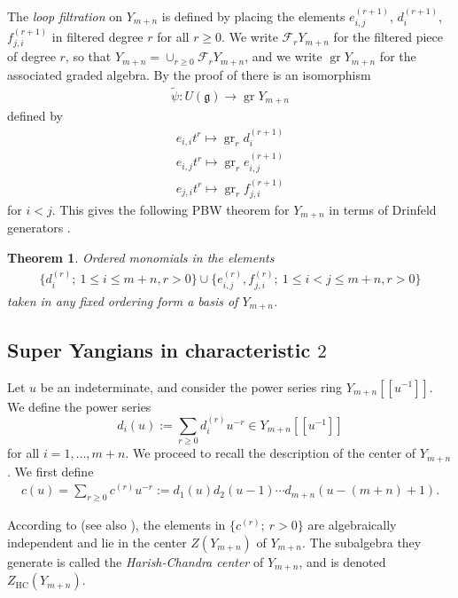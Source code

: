 \documentclass[12pt,reqno]{amsart}
\newcommand{\cF}{\mathcal{F}}
\newcommand{\fg}{\mathfrak{g}}
\DeclareMathOperator{\gr}{gr}
\DeclareMathOperator{\HC}{HC}
\numberwithin{equation}{section}
\newtheorem{Theorem}{Theorem}[section]
\theoremstyle{Theorem}
\theoremstyle{remark}
\numberwithin{equation}{section}
\begin{document}
The {\it loop filtration} on $Y_{m+n}$ is defined by placing the elements $e_{i,j}^{(r+1)}$,
$d_{i}^{(r+1)}$, $f_{j,i}^{(r+1)}$ in filtered degree $r$ for all $r\geq 0$. 
We write $\cF_r Y_{m+n}$ for the filtered piece of degree $r$,
so that $Y_{m+n}=\cup_{r\geq 0}\cF_r Y_{m+n}$,
and we write $\gr Y_{m+n}$ for the associated graded algebra.
By the proof of \cite[Theorem 4.3]{BT18} there is an isomorphism
\begin{align}\label{ug iso grymn}
\tilde{\psi}: U(\fg)\rightarrow \gr Y_{m+n}
\end{align}
defined by
\begin{equation}
\begin{aligned}\label{gr def}
e_{i,i}t^r\mapsto \gr_r d_i^{(r+1)}\\
e_{i,j}t^r\mapsto \gr_r e_{i,j}^{(r+1)}\\
e_{j,i}t^r\mapsto \gr_r f_{j,i}^{(r+1)}
\end{aligned}
\end{equation}
for $i<j$.
This gives the following PBW theorem for $Y_{m+n}$ in terms of Drinfeld generators \cite[Theorem 4.5]{BT18}.
\begin{Theorem}\label{thm:PBW ymn Drinfeld}
Ordered monomials in the elements
\begin{align}\label{Drinfeld generators}
 \{d_i^{(r)};~1\leq i\leq m+n, r>0\}\cup\{e_{i,j}^{(r)},f_{j,i}^{(r)};~1\leq i<j\leq m+n, r>0\}   
\end{align}
taken in any fixed ordering form a basis of $Y_{m+n}$.
\end{Theorem}
\subsection{Super Yangians in characteristic $2$}
Let $u$ be an indeterminate,
and consider the power series ring $Y_{m+n}[[u^{-1}]]$.
We define the power series
\[
d_i(u):=\sum\limits_{r\geq 0}d_i^{(r)}u^{-r}\in Y_{m+n}[[u^{-1}]]
\]
for all $i=1,\dots,m+n$.
We proceed to recall the description of the center of $Y_{m+n}$.
We first define
\begin{align}\label{cr}
c(u)=\sum\limits_{r\geq 0}c^{(r)}u^{-r}:=d_1(u)d_2(u-1)\cdots d_{m+n}(u-(m+n)+1).
\end{align}

According to \cite[Theorem 5.11(1)]{BT18} (see also \cite[Theorem 7.2]{BK05}),
the elements in $\{c^{(r)};~r>0\}$ are algebraically independent and lie in the center $Z(Y_{m+n})$ of $Y_{m+n}$.
The subalgebra they generate is called the {\it Harish-Chandra center} of $Y_{m+n}$, 
and is denoted $Z_{\HC}(Y_{m+n})$.
\end{document}
